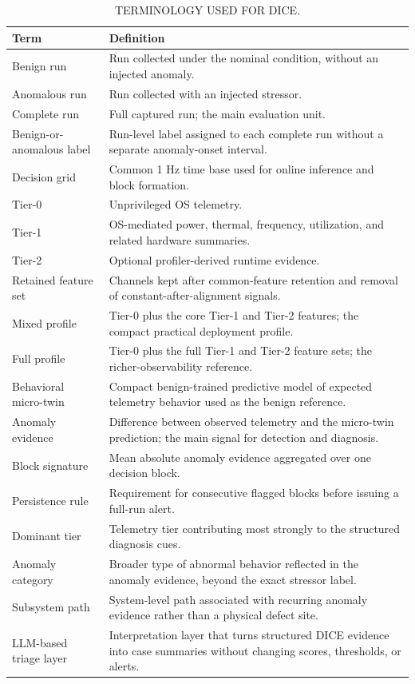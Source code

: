 \begin{table}[t]
\caption{TERMINOLOGY USED FOR DICE.}
\label{tab:app_terms}
\centering
\footnotesize
\begin{tabular}{p{} p{}}
\hline
\textbf{Term} & \textbf{Definition} \\
\hline
Benign run & Run collected under the nominal condition, without an injected anomaly. \\
Anomalous run & Run collected with an injected stressor. \\
Complete run & Full captured run; the main evaluation unit. \\
Benign-or-anomalous label & Run-level label assigned to each complete run without a separate anomaly-onset interval. \\
Decision grid & Common 1 Hz time base used for online inference and block formation. \\
Tier-0 & Unprivileged OS telemetry. \\
Tier-1 & OS-mediated power, thermal, frequency, utilization, and related hardware summaries. \\
Tier-2 & Optional profiler-derived runtime evidence. \\
Retained feature set & Channels kept after common-feature retention and removal of constant-after-alignment signals. \\
Mixed profile & Tier-0 plus the core Tier-1 and Tier-2 features; the compact practical deployment profile. \\
Full profile & Tier-0 plus the full Tier-1 and Tier-2 feature sets; the richer-observability reference. \\
Behavioral micro-twin & Compact benign-trained predictive model of expected telemetry behavior used as the benign reference. \\
Anomaly evidence & Difference between observed telemetry and the micro-twin prediction; the main signal for detection and diagnosis. \\
Block signature & Mean absolute anomaly evidence aggregated over one decision block. \\
Persistence rule & Requirement for consecutive flagged blocks before issuing a full-run alert. \\
Dominant tier & Telemetry tier contributing most strongly to the structured diagnosis cues. \\
Anomaly category & Broader type of abnormal behavior reflected in the anomaly evidence, beyond the exact stressor label. \\
Subsystem path & System-level path associated with recurring anomaly evidence rather than a physical defect site. \\
LLM-based triage layer & Interpretation layer that turns structured DICE evidence into case summaries without changing scores, thresholds, or alerts. \\
\hline
\end{tabular}
\end{table}

\FloatBarrier
